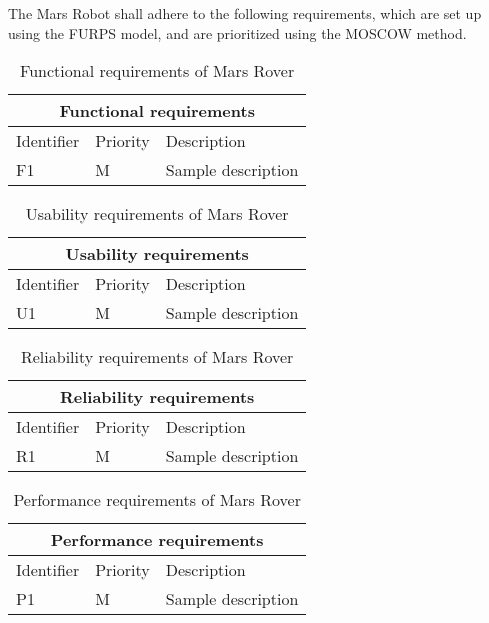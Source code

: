 The Mars Robot shall adhere to the following requirements, which are set up
using the FURPS model, and are prioritized using the MOSCOW method.

\begin{table}[H]
	\centering
	\begin{tabular}{|l|l|l|}
		\hline
		\multicolumn{3}{|c|}{Functional requirements} \\  \hline
		\hline
		Identifier & Priority & Description \\  
		\hline
		\hline
		F1 & M & Sample description \\  
		\hline
	\end{tabular}
\caption{Functional requirements of Mars Rover}
\label{tbl:functionalReq}
\end{table}

\begin{table}[H]
	\centering
	\begin{tabular}{|l|l|l|}
		\hline
		\multicolumn{3}{|c|}{Usability requirements} \\  \hline
		\hline
		Identifier & Priority & Description \\  
		\hline
		\hline
		U1 & M & Sample description \\  
		\hline
	\end{tabular}
\caption{Usability requirements of Mars Rover}
\label{tbl:usabilityReq}
\end{table}

\begin{table}[H]
	\centering
	\begin{tabular}{|l|l|l|}
		\hline
		\multicolumn{3}{|c|}{Reliability requirements} \\  \hline
		\hline
		Identifier & Priority & Description \\  
		\hline
		\hline
		R1 & M & Sample description \\  
		\hline
	\end{tabular}
\caption{Reliability requirements of Mars Rover}
\label{tbl:reliabilityReq}
\end{table}

\begin{table}[H]
	\centering
	\begin{tabular}{|l|l|l|}
		\hline
		\multicolumn{3}{|c|}{Performance requirements} \\  \hline
		\hline
		Identifier & Priority & Description \\  
		\hline
		\hline
		P1 & M & Sample description \\  
		\hline
	\end{tabular}
\caption{Performance requirements of Mars Rover}
\label{tbl:performanceReq}
\end{table}

